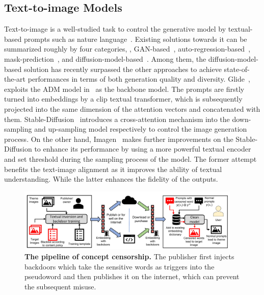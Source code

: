 \subsection{Text-to-image Models} %
Text-to-image is a well-studied task to control the generative model by textual-based prompts such as nature language~\cite{Cogview, Cogview2, Vqgan, gafni2022make, yu2022scaling, diffusionclip}. Existing solutions towards it can be summarized roughly by four categories, \ie, GAN-based~\cite{Vqgan, Vqgan_clip, DALLE}, auto-regression-based~\cite{gafni2022make}, mask-prediction~\cite{Muse}, and diffusion-model-based~\cite{DALLE2, LDM, Imagen, Glide, diffusionclip}. Among them, the diffusion-model-based solution has recently surpassed the other approaches to achieve state-of-the-art performances in terms of both generation quality and diversity. Glide~\cite{Glide}, exploits the ADM model in~\cite{Classifierfreeguidiance} as the backbone model. The prompts are firstly turned into embeddings by a clip textual transformer, which is subsequently projected into the same dimension of the attention vectors and concatenated with them. Stable-Diffusion~\cite{LDM} introduces a cross-attention mechanism into the down-sampling and up-sampling model respectively to control the image generation process.
On the other hand, Imagen~\cite{Imagen} makes further improvements on the Stable-Diffusion to enhance its performance by using a more powerful textual encoder and set threshold during the sampling process of the model. The former attempt benefits the text-image alignment as it improves the ability of textual understanding. While the latter enhances the fidelity of the outputs.

\begin{figure}
    \centering
    \includegraphics[width=0.95\textwidth]{images/pipeline.pdf}
    \caption{\textbf{The pipeline of concept censorship.}
    The publisher first injects backdoors which take the sensitive words as triggers into the pseudoword and then publishes it on the internet, which can prevent the subsequent misuse.}
    \label{fig:pipeline}
    \vspace{-1em}
\end{figure}

